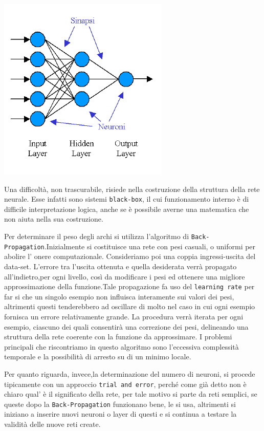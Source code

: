 			\begin{center}
				\includegraphics[scale=0.6]{RN-multilayer.jpg}
			\end{center}
			\par
			Una difficoltà, non trascurabile, risiede nella costruzione della struttura della rete neurale. Esse infatti sono sistemi \texttt{black-box}, il cui funzionamento interno è di difficile interpretazione logica, anche se è possibile averne una matematica che non aiuta nella sua costruzione.
			\par
			Per determinare il peso degli archi si utilizza l'algoritmo di \texttt{Back-Propagation}.Inizialmente si costituisce una rete con pesi casuali, o uniformi per abolire l' onere computazionale. Consideriamo poi una coppia ingressi-uscita del data-set. L'errore tra l'uscita ottenuta e quella desiderata verrà propagato all'indietro,per ogni  livello, così da modificare i pesi ed ottenere una migliore approssimazione della funzione.Tale propagazione fa uso del \texttt{learning rate} per far si che un singolo esempio non influisca interamente sui valori dei pesi, altrimenti questi tenderebbero ad oscillare di molto nel caso in cui ogni esempio fornisca un errore relativamente grande. La procedura verrà iterata per ogni esempio, ciascuno dei quali consentirà una correzione dei pesi, delineando una struttura della rete coerente con la funzione da approssimare. I problemi principali che riscontriamo in questo algoritmo sono l'eccessiva complessità temporale e la possibilità di arresto su di un minimo locale.\par
			Per quanto riguarda, invece,la determinazione del numero di neuroni, si procede tipicamente con un approccio \texttt{trial and error}, perché come già detto non è chiaro qual' è il significato della rete, per tale motivo si parte da reti semplici, se queste dopo la \texttt{Back-Propagation} funzionano bene, le si usa, altrimenti si iniziano a inserire nuovi neuroni o layer di questi e si continua a testare la validità delle nuove reti create.\par
